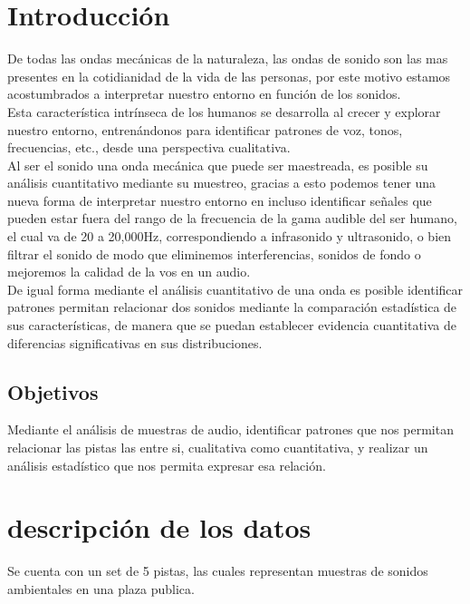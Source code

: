 \chapter{Introducción}
De todas las ondas mecánicas de la naturaleza, las ondas de sonido son las mas presentes en la cotidianidad de la vida de las personas, por este motivo estamos acostumbrados a interpretar nuestro entorno en función de los sonidos.\\

Esta característica intrínseca de los humanos se desarrolla al crecer y explorar nuestro entorno, entrenándonos para identificar patrones de voz, tonos, frecuencias, etc., desde una perspectiva cualitativa.\\

Al ser el sonido una onda mecánica que puede ser maestreada, es posible su análisis cuantitativo mediante su muestreo, gracias a esto podemos tener una nueva forma de interpretar nuestro entorno en incluso identificar señales que pueden estar fuera del rango de la frecuencia de la gama audible del ser humano, el cual va de 20 a 20,000Hz, correspondiendo a infrasonido y ultrasonido, o bien filtrar el sonido de modo que eliminemos interferencias, sonidos de fondo o mejoremos la calidad de la vos en un audio.\\

De igual forma mediante el análisis cuantitativo de una onda es posible identificar patrones permitan relacionar dos sonidos mediante la comparación estadística de sus características, de manera que se puedan establecer evidencia cuantitativa de diferencias significativas en sus distribuciones.\\ 

\section{Objetivos}

Mediante el análisis de muestras de audio, identificar patrones que nos permitan relacionar las pistas las entre si, cualitativa como cuantitativa, y realizar un análisis estadístico que nos permita expresar esa relación.\\

\chapter{descripción de los datos}

Se cuenta con un set de 5 pistas, las cuales representan muestras de sonidos ambientales en una plaza publica.\\


